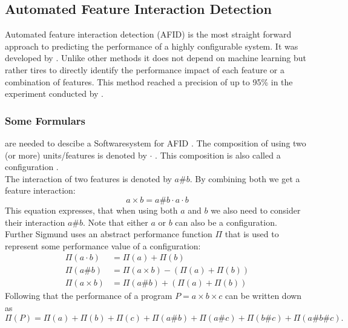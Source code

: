 \subsection{Automated Feature Interaction Detection}\label{sec:AFID}

Automated feature interaction detection (AFID) is the most straight forward approach to predicting the performance of a highly configurable system.
It was developed by \citet{AutomatedFeatureDetectionSiegmund2012}. Unlike other methods it does not depend on machine learning but rather tires to directly identify the performance impact of each feature or a combination of features. This method reached a precision of up to 95\% in the experiment conducted by  \citet{AutomatedFeatureDetectionSiegmund2012}.

\subsubsection[Formulars]{\textnormal{Some} Formulars} are needed to descibe a Softwaresystem for AFID .
The composition of using two (or more) units/features is denoted by $\cdot$ . This composition is also called a configuration \cite{VariabilityAwarePerformancePredictionJianmeiSigmundApel}.\\
The interaction of two features is denoted by $a\#b$. By combining both we get a feature interaction:
\begin{equation}
 a \times b = a\#b \cdot a \cdot b
\end{equation} 
This equation expresses, that when using both $a$ and $b$ we also need to consider their interaction $a\# b$. Note that either $a$ or $b$ can also be a configuration.\\
Further Sigmund uses an abstract performance function $\Pi$ that is used to represent some performance value of a configuration:
\begin{align}
\Pi(a \cdot b) &= \Pi(a) + \Pi(b)\label{eq:featureInteraction_SimplePerformance}\\
\Pi(a\#b) &= \Pi(a \times b) - (\Pi(a) + \Pi(b))\\
\Pi(a \times b) &=  \Pi(a\#b) + (\Pi(a) + \Pi(b))\label{eq:featureInteraction_InteractionPerformances}
\end{align}
Following that the performance of a program $P = a \times b \times c$ can be written down as
\begin{equation}\label{eq:featureInteraction_ProgrammPerformance}
\Pi(P) = \Pi(a) +  \Pi(b) +  \Pi(c) +  \Pi(a\#b) +  \Pi(a\#c) +  \Pi(b\#c) +  \Pi(a\#b\#c). 
\end{equation}
